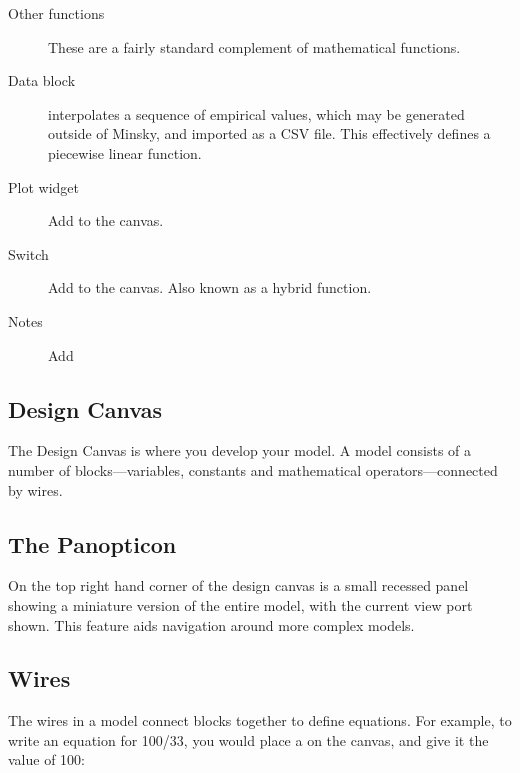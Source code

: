 \begin{description}
\item[Other functions] These are a fairly standard
complement of mathematical functions.

\item[Data block]   interpolates a sequence of empirical values, which may
be generated outside of Minsky, and imported as a CSV file. This
effectively defines a piecewise linear function.

\item[Plot widget]  Add  to the canvas.

\item[Switch]  Add  
to the canvas. Also known as a hybrid function.

\item[Notes] Add 

\end{description}

\subsection{Design Canvas}
\label{DesignCanvas}

The Design Canvas is where you develop your model. A model consists of
a number of blocks---variables, constants and mathematical
operators---connected by wires. 


\subsection{The Panopticon}\label{Panopticon}

On the top right hand corner of the design canvas is a small recessed
panel showing a miniature version of the entire model, with the
current view port shown. This feature aids navigation around more
complex models.

\subsection{Wires}
\label{Wires}

The wires in a model connect blocks together to define equations. For
example, to write an equation for 100/33, you would place a
 on the canvas, and give it the value of 100:

